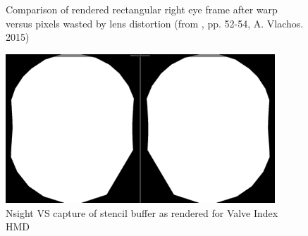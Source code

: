 \begin{figure}[h]
  \centering
  \hspace*{\fill}
  \hfill
  \hspace*{\fill}
     \caption{Comparison of rendered rectangular right eye frame after warp versus pixels wasted by lens distortion (from \cite{Vlachos.2015}, pp. 52-54, A. Vlachos. 2015)}
     \label{fig:stencil_wastecomparison}
\end{figure}

\begin{figure}[htb]
  \centering
  \includegraphics[width=0.9\textwidth]{pictures/stencilmask_Index_crop}
  \caption{\gls{Nsight VS} capture of stencil buffer as rendered for Valve Index \gls{HMD}} \label{fig:stencil_index}
\end{figure}

